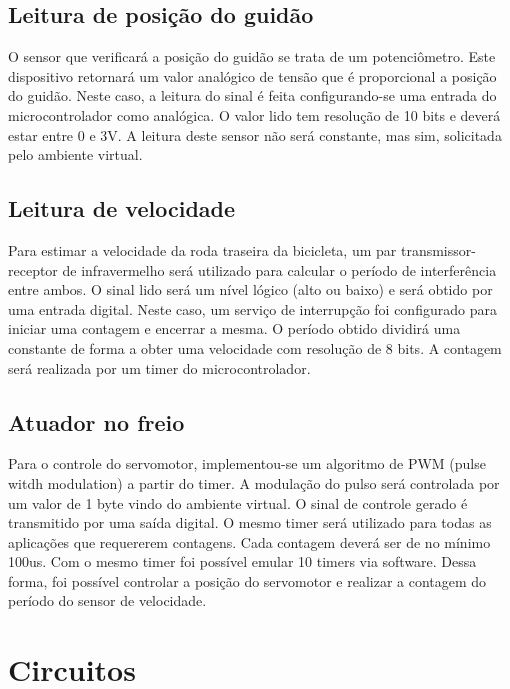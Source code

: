 \subsection{Leitura de posição do guidão} %
\label{sub:read_guid_sens}
O sensor que verificará a posição do guidão se trata de um potenciômetro. Este dispositivo retornará um valor analógico de tensão que é proporcional a posição do guidão. Neste caso, a leitura do sinal é feita configurando-se uma entrada do microcontrolador como analógica. O valor lido tem resolução de 10 bits e deverá estar entre 0 e 3V. A leitura deste sensor não será constante, mas sim, solicitada pelo ambiente virtual.

\subsection{Leitura de velocidade} %
\label{sub:read_vel_sens}

Para estimar a velocidade da roda traseira da bicicleta, um par transmissor-receptor de infravermelho será utilizado para calcular o período de interferência entre ambos. O sinal lido será um nível lógico (alto ou baixo)  e será obtido por uma entrada digital. Neste caso, um serviço de interrupção foi configurado para iniciar uma contagem e encerrar a mesma. O período obtido dividirá uma constante de forma a obter uma velocidade com resolução de 8 bits. A contagem será realizada por um timer do microcontrolador.

\subsection{Atuador no freio} %
\label{sub:read_freio_sens}

Para o controle do servomotor, implementou-se um algoritmo de PWM (pulse witdh modulation) a partir do timer. A modulação do pulso será controlada por um valor de 1 byte vindo do ambiente virtual. O sinal de controle gerado é transmitido por uma saída digital. O mesmo timer será utilizado para todas as aplicações que requererem contagens. Cada contagem deverá ser de no mínimo 100us. Com o mesmo timer foi possível emular 10 timers via software. Dessa forma, foi possível controlar a posição do servomotor e realizar a contagem do período do sensor de velocidade.

\section{Circuitos} %
\label{sec:circuito}

